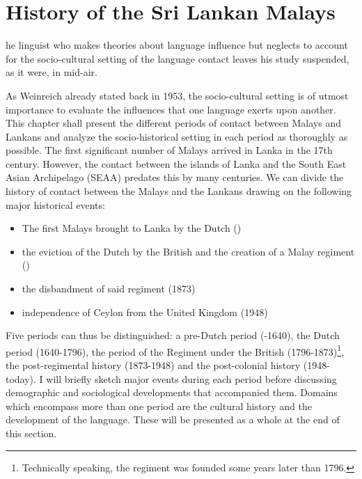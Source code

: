 \chapter{History of the Sri Lankan Malays}

\begin{motto}
   [T]he linguist who makes theories about language influence but neglects to account for the socio-cultural setting of the language contact leaves his study suspended, as it were, in mid-air. \citep[4]{Weinreich1953}
\end{motto}

As Weinreich already stated back in 1953, the socio-cultural
setting is of utmost importance to evaluate the influences that
one language exerts upon another. This chapter shall present the
different periods of contact between Malays and Lankans and
analyze the socio-historical setting in each period as thoroughly
as possible. The first significant number of Malays arrived in
Lanka in the 17th century. However, the contact between the
islands of Lanka and the South East Asian Archipelago (SEAA)
predates this by many centuries. We can divide the history of
contact between the Malays and the Lankans drawing on the
following major historical events:

\begin{itemize}
    \item The first Malays brought to Lanka by the Dutch ()
    \item the eviction of the Dutch by the British and the creation of a Malay regiment ()
    \item the disbandment of said regiment (1873)
    \item independence of Ceylon from the United Kingdom (1948)
\end{itemize}

Five periods can thus be distinguished: a pre-Dutch period (-1640), the Dutch period (1640-1796), the period of the Regiment under the British (1796-1873)\footnote{Technically speaking, the regiment was founded some years later than 1796.}, the post-regimental history (1873-1948) and the post-colonial history (1948-today). I will briefly sketch major events during each period before discussing demographic and sociological developments that accompanied them. Domains which encompass more than one period are the cultural history and the development of the language. These will be presented as a whole at the end of this section.

